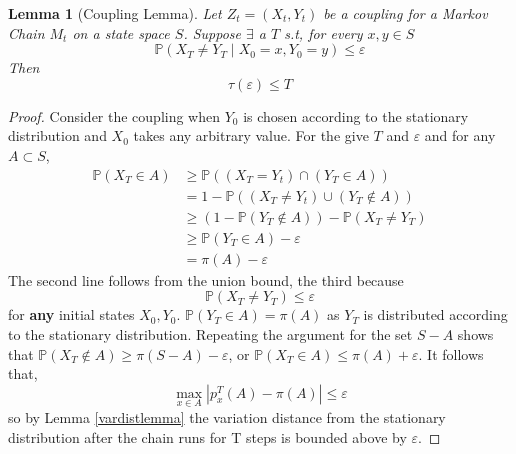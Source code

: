 \documentclass[11pt]{article}
\newtheorem{lem}{Lemma}[section]
\begin{document}
\begin{lem}[Coupling Lemma]
Let \(Z_t = \left(X_t,Y_t\right) \) be a coupling for a Markov Chain \(M_t\) on a state space \(S\). Suppose \(\exists\) a \(T\) s.t, for every \(x,y \in S\)
\begin{equation}
\mathbb{P}\left(X_T \neq Y_T \mid X_0 = x, Y_0 = y \right)\leq \varepsilon
\end{equation}
Then
\begin{equation}
\tau\left(\varepsilon\right) \leq T
\end{equation}
\end{lem}
\begin{proof}
Consider the coupling when \(Y_0\) is chosen according to the stationary distribution and \(X_0\) takes any arbitrary value. For the give \(T\) and \(\varepsilon\) and for any \(A \subset S\),
\begin{align}
\mathbb{P}\left(X_T \in A\right) &\geq \mathbb{P}\left(\left(X_T=Y_t\right)\cap\left(Y_T \in A\right)\right) \\
&= 1 - \mathbb{P}\left(\left(X_T \neq Y_t\right)\cup\left(Y_T \not\in A\right)\right) \\
&\geq \left(1 - \mathbb{P}\left(Y_T \not\in A\right)\right) - \mathbb{P}\left(X_T \neq Y_T\right) \\
&\geq \mathbb{P}\left(Y_T \in A\right) - \varepsilon \\
&= \pi\left(A\right) - \varepsilon
\end{align}
The second line follows from the union bound, the third because
\begin{equation}
\mathbb{P}\left(X_T \neq Y_T\right)  \leq \varepsilon
\end{equation} 
for \textbf{any} initial states \( X_0,Y_0 \). \( \mathbb{P}\left(Y_T \in A\right) = \pi\left(A\right) \) as \(Y_T\) is distributed according to the stationary distribution. 
Repeating the argument for the set \(S-A\) shows that \(\mathbb{P}\left(X_T \not\in A\right) \geq \pi\left(S-A\right) - \varepsilon\), or \( \mathbb{P}\left(X_T \in A\right) \leq \pi\left(A\right) + \varepsilon\).  It follows that,
\begin{equation}
\underset{x \in A}{\operatorname{max}}|p_x^T\left(A\right) - \pi\left(A\right)| \leq \varepsilon
\end{equation}
so by Lemma \ref{vardistlemma} the variation distance from the stationary distribution after the chain runs for T steps is bounded above by \(\varepsilon\). 
\end{proof}
\end{document}
